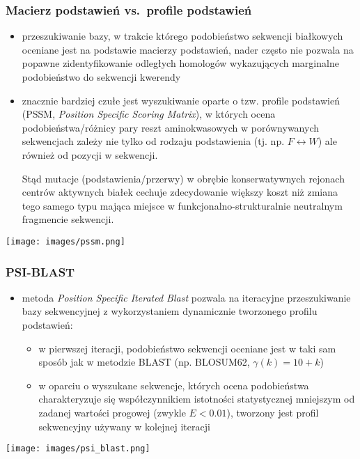 \begin{frame}
\frametitle{Macierz podstawień vs.\ profile podstawień}

\begin{itemize}\scriptsize
 \item przeszukiwanie bazy, w trakcie którego podobieństwo sekwencji
 białkowych oceniane jest na podstawie macierzy podstawień, nader
 często nie pozwala na popawne zidentyfikowanie odległych homologów
 wykazujących marginalne podobieństwo do sekwencji kwerendy

 \item znacznie bardziej czułe jest wyszukiwanie oparte o tzw. profile
 podstawień (PSSM, \emph{Position Specific Scoring Matrix}), w których
 ocena podobieństwa/różnicy pary reszt aminokwasowych w porównywanych
 sekwencjach zależy nie tylko od rodzaju podstawienia (tj. np. $F
 \leftrightarrow W$) ale również od pozycji w sekwencji.

 Stąd mutacje (podstawienia/przerwy) w obrębie konserwatywnych
 rejonach centrów aktywnych białek cechuje zdecydowanie większy koszt
 niż zmiana tego samego typu mająca miejsce w
 funkcjonalno-strukturalnie neutralnym fragmencie sekwencji.

\end{itemize}

\begin{center}
\texttt{[image: images/pssm.png]}
\end{center}
\end{frame}

\begin{frame}
\frametitle{PSI-BLAST}

\begin{itemize}\scriptsize
 \item metoda \emph{Position Specific Iterated Blast}
 pozwala na iteracyjne przeszukiwanie bazy sekwencyjnej z
 wykorzystaniem dynamicznie tworzonego profilu podstawień:

\begin{itemize}\scriptsize
 \item w pierwszej iteracji, podobieństwo sekwencji oceniane jest w
 taki sam sposób jak w metodzie BLAST (np. BLOSUM62, $\gamma(k) = 10 +
 k$)

 \item w oparciu o wyszukane sekwencje, których ocena podobieństwa
 charakteryzuje się współczynnikiem istotności statystycznej mniejszym
 od zadanej wartości progowej (zwykle $E < 0.01$), tworzony jest
 profil sekwencyjny używany w kolejnej iteracji
\end{itemize}
\end{itemize}

\begin{center}
\texttt{[image: images/psi\_blast.png]}
\end{center}

\end{frame}



